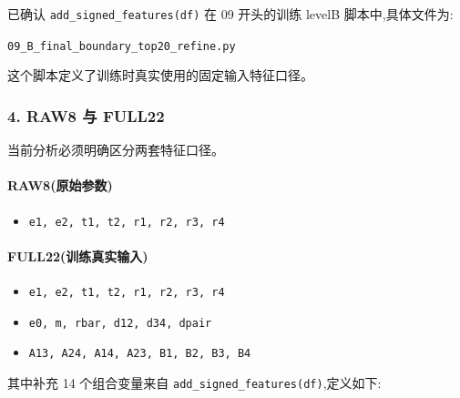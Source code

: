 \documentclass[lang=cn,scheme=chinese,color=blue,device=normal,toc=onecol,math=cm]{elegantbook}
\begin{document}
已确认 \texttt{add\_\allowbreak{}signed\_\allowbreak{}features(df)} 在 09 开头的训练 levelB 脚本中,具体文件为:\par


\texttt{09\_\allowbreak{}B\_\allowbreak{}final\_\allowbreak{}boundary\_\allowbreak{}top20\_\allowbreak{}refine.py}\par


这个脚本定义了训练时真实使用的固定输入特征口径。\par


\subsubsection{4. RAW8 与 FULL22}


当前分析必须明确区分两套特征口径。\par


\paragraph{RAW8(原始参数)}


\begin{itemize}
\item \texttt{e1, e2, t1, t2, r1, r2, r3, r4}
\end{itemize}


\paragraph{FULL22(训练真实输入)}


\begin{itemize}
\item \texttt{e1, e2, t1, t2, r1, r2, r3, r4}
\item \texttt{e0, m, rbar, d12, d34, dpair}
\item \texttt{A13, A24, A14, A23, B1, B2, B3, B4}
\end{itemize}


其中补充 14 个组合变量来自 \texttt{add\_\allowbreak{}signed\_\allowbreak{}features(df)},定义如下:\par
\end{document}
